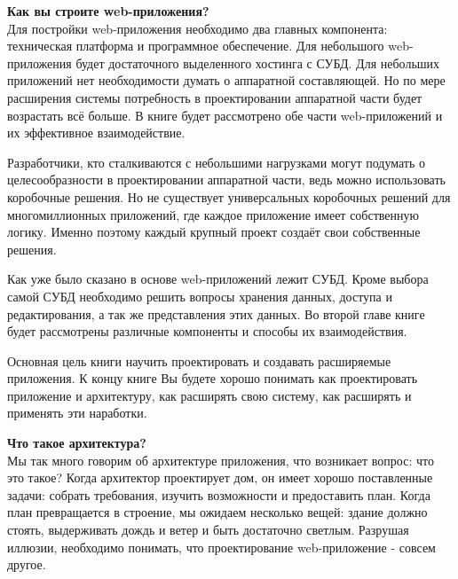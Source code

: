 \textbf{Как вы строите web-приложения?}\\

Для постройки web-приложения необходимо два главных компонента: техническая платформа и программное обеспечение. Для небольшого web-приложения будет достаточного выделенного хостинга с СУБД. Для небольших приложений нет необходимости думать о аппаратной составляющей. Но по мере расширения системы потребность в проектировании аппаратной части будет возрастать всё больше. В книге будет рассмотрено обе части web-приложений и их эффективное взаимодействие.


Разработчики, кто сталкиваются с небольшими нагрузками могут подумать о целесообразности в проектировании аппаратной части, ведь можно использовать коробочные решения. Но не существует универсальных коробочных решений для многомиллионных приложений, где  каждое приложение имеет собственную логику. Именно поэтому каждый крупный проект создаёт свои собственные решения.

Как уже было сказано в основе web-приложений лежит СУБД. Кроме выбора самой СУБД необходимо решить вопросы хранения данных, доступа и редактирования, а так же представления этих данных. Во второй главе книге будет рассмотрены различные компоненты и способы их взаимодействия.

Основная цель книги научить проектировать и создавать расширяемые приложения. К концу книге Вы будете хорошо понимать как проектировать приложение и архитектуру, как расширять свою систему, как расширять и применять эти наработки.



\textbf{Что такое архитектура?}\\

Мы так много говорим об архитектуре приложения, что возникает вопрос: что это такое? Когда архитектор проектирует дом, он имеет хорошо поставленные задачи: собрать требования, изучить возможности и предоставить план. Когда план превращается в строение, мы ожидаем  несколько вещей: здание должно  стоять, выдерживать дождь и ветер и быть достаточно светлым. Разрушая иллюзии, необходимо понимать, что проектирование web-приложение - совсем другое.

